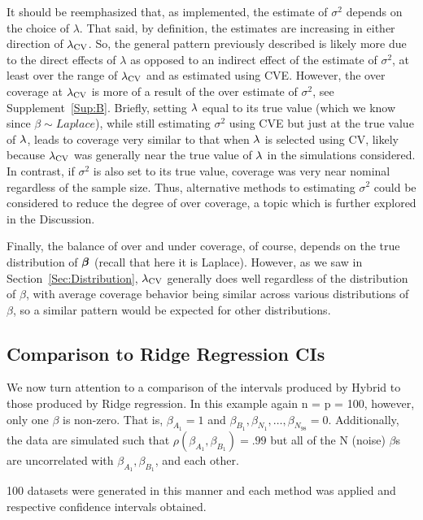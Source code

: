 It should be reemphasized that, as implemented, the estimate of $\sigma^2$ depends on the choice of $\lambda$. That said, by definition, the estimates are increasing in either direction of $\lambda_{\textrm{CV}}$. So, the general pattern previously described is likely more due to the direct effects of $\lambda$ as opposed to an indirect effect of the estimate of $\sigma^2$, at least over the range of $\lambda_{\textrm{CV}}$ and as estimated using CVE. However, the over coverage at $\lambda_{\textrm{CV}}$ is more of a result of the over estimate of $\sigma^2$, see Supplement~\ref{Sup:B}. Briefly, setting $\lambda$ equal to its true value (which we know since $\beta \sim Laplace$), while still estimating $\sigma^2$ using CVE but just at the true value of $\lambda$, leads to coverage very similar to that when $\lambda$ is selected using CV, likely because $\lambda_{\textrm{CV}}$ was generally near the true value of $\lambda$ in the simulations considered. In contrast, if $\sigma^2$ is also set to its true value, coverage was very near nominal regardless of the sample size. Thus, alternative methods to estimating $\sigma^2$ could be considered to reduce the degree of over coverage, a topic which is further explored in the Discussion. 

Finally, the balance of over and under coverage, of course, depends on the true distribution of $\boldsymbol{\beta}$ (recall that here it is Laplace). However, as we saw in Section~\ref{Sec:Distribution}, $\lambda_{\textrm{CV}}$ generally does well regardless of the distribution of $\beta$, with average coverage behavior being similar across various distributions of $\beta$, so a similar pattern would be expected for other distributions.

\subsection{Comparison to Ridge Regression CIs}\label{Sec:Ridge}

We now turn attention to a comparison of the intervals produced by Hybrid to those produced by Ridge regression. In this example again n = p = 100, however, only one $\beta$ is non-zero. That is, $\beta_{A_1} = 1$ and $\beta_{B_1}, \beta_{N_1}, \ldots, \beta_{N_{98}} = 0$. Additionally, the data are simulated such that $\rho(\beta_{A_1}, \beta_{B_1}) = .99$ but all of the N (noise) $\beta$s are uncorrelated with $\beta_{A_1}, \beta_{B_1}$, and each other.

100 datasets were generated in this manner and each method was applied and respective confidence intervals obtained.

